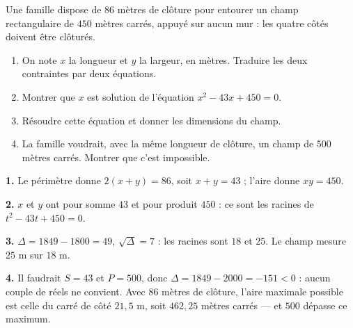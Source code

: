 \begin{situation}
Une famille dispose de $86$ mètres de clôture pour entourer
un champ rectangulaire de $450$ mètres carrés, appuyé sur aucun mur : les
quatre côtés doivent être clôturés.

\begin{enumerate}[label=\textbf{\arabic*.}, leftmargin=*, itemsep=0.3em]
  \item On note $x$ la longueur et $y$ la largeur, en mètres. Traduire les
        deux contraintes par deux équations.
  \item Montrer que $x$ est solution de l'équation
        $x^{2}-43x+450 = 0$.
  \item Résoudre cette équation et donner les dimensions du champ.
  \item La famille voudrait, avec la même longueur de clôture, un champ de
        $500$ mètres carrés. Montrer que c'est impossible.
\end{enumerate}
\end{situation}

\begin{corrige}
\textbf{1.} Le périmètre donne $2(x+y) = 86$, soit $x+y = 43$ ; l'aire donne
$xy = 450$.

\textbf{2.} $x$ et $y$ ont pour somme $43$ et pour produit $450$ : ce sont
les racines de $t^{2}-43t+450 = 0$.

\textbf{3.} $\Delta = 1849-1800 = 49$, $\sqrt\Delta = 7$ : les racines sont
$18$ et $25$. Le champ mesure $25$ m sur $18$ m.

\textbf{4.} Il faudrait $S = 43$ et $P = 500$, donc
$\Delta = 1849-2000 = -151 < 0$ : aucun couple de réels ne convient. Avec
$86$ mètres de clôture, l'aire maximale possible est celle du carré de côté
$21{,}5$ m, soit $462{,}25$ mètres carrés — et $500$ dépasse ce maximum.
\end{corrige}


